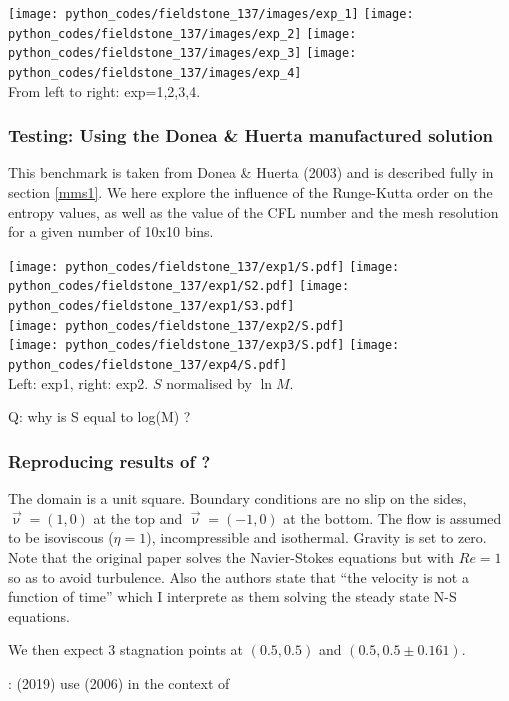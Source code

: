 
\begin{center}
\texttt{[image: python\_codes/fieldstone\_137/images/exp\_1]}
\texttt{[image: python\_codes/fieldstone\_137/images/exp\_2]}
\texttt{[image: python\_codes/fieldstone\_137/images/exp\_3]}
\texttt{[image: python\_codes/fieldstone\_137/images/exp\_4]}\\
{\captionfont From left to right: exp=1,2,3,4.}
\end{center}

\subsubsection*{Testing: Using the Donea \& Huerta manufactured solution}

This benchmark is taken from Donea \& Huerta (2003) \cite{dohu03} and is described fully 
in section \ref{mms1}. 
We here explore the influence of the Runge-Kutta order on the entropy values, 
as well as the value of the CFL number and 
the mesh resolution for a given number of 10x10 bins. 

\begin{center}
\texttt{[image: python\_codes/fieldstone\_137/exp1/S.pdf]}
\texttt{[image: python\_codes/fieldstone\_137/exp1/S2.pdf]}
\texttt{[image: python\_codes/fieldstone\_137/exp1/S3.pdf]}\\
\texttt{[image: python\_codes/fieldstone\_137/exp2/S.pdf]}\\
\texttt{[image: python\_codes/fieldstone\_137/exp3/S.pdf]}
\texttt{[image: python\_codes/fieldstone\_137/exp4/S.pdf]}\\
{\captionfont Left: exp1, right: exp2. $S$ normalised by $\ln{M}$.}
\end{center}

Q: why is S equal to log(M) ?

\subsubsection*{Reproducing results of \textcite{cakm06}?}

The domain is a unit square. Boundary conditions are no slip on the sides, 
$\vec\upnu=(1,0)$ at the top and $\vec\upnu=(-1,0)$ at the bottom.
The flow is assumed to be isoviscous ($\eta=1$), incompressible and isothermal. 
Gravity is set to zero.
Note that the original paper \cite{cakm06} solves the Navier-Stokes equations but with $Re=1$
so as to avoid turbulence.
Also the authors state that ``the velocity is not a function of time'' which I interprete as 
them solving the steady state N-S equations. 

We then expect 3 stagnation points at $(0.5,0.5)$ and $(0.5,0.5\pm 0.161)$.


\Literature: \textcite{widd19} (2019) use \textcite{cakm06} (2006) in the context of 
